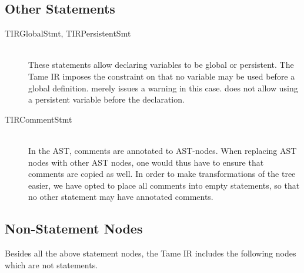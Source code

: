\subsection{Other Statements}
\begin{description}
\item[TIRGlobalStmt, TIRPersistentSmt] \hfill \\
These statements allow declaring variables to be global or persistent.
The Tame IR imposes the constraint on \matlab that no variable
may be used before a global definition. \matlab merely issues a warning
in this case. \matlab does not allow using a persistent variable
before the declaration.

\item[TIRCommentStmt] \hfill \\
In the AST, comments are annotated to AST-nodes. When replacing
AST nodes with other AST nodes, one would thus have to ensure that comments are copied
as well. In order to make transformations of the tree easier,
we have opted to place all comments into empty statements, so 
that no other statement may have annotated comments.

\end{description}

\subsection{Non-Statement Nodes}
Besides all the above statement nodes, the Tame IR includes the following
nodes which are not statements.

